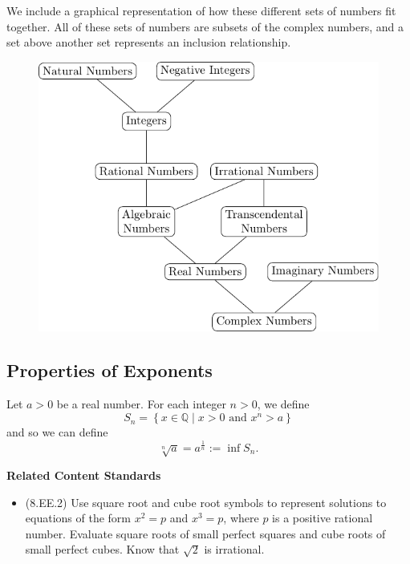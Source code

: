 \documentclass[
]{book}
\providecommand{\tightlist}{%
  \setlength{\itemsep}{0pt}\setlength{\parskip}{0pt}}
\newenvironment{standards}{}{}
\theoremstyle{definition}
\theoremstyle{definition}
\theoremstyle{definition}
\theoremstyle{definition}
\theoremstyle{remark}
\begin{document}
We include a graphical representation of how these different sets of numbers fit together. All of these sets of numbers are subsets of the complex numbers, and a set above another set represents an inclusion relationship.

\begin{figure}

{\centering \includegraphics[width=0.6\linewidth]{tikz/NumberTree} 

}

\end{figure}

\hypertarget{real-exponents}{%
\subsection{Properties of Exponents}\label{real-exponents}}

Let \(a>0\) be a real number. For each integer \(n>0\), we define \[S_n= \left\{ x\in \mathbb{Q}\middle \vert x>0 \mbox{ and } x^n>a\right\}\] and so we can define \[\sqrt[n]{a}=a^{\frac{1}{n}} := \inf S_n.\]

\begin{standards}

\begin{center}
\textbf{Related Content Standards}

\end{center}

\begin{itemize}
\tightlist
\item
  (8.EE.2) Use square root and cube root symbols to represent solutions to equations of the form \(x^2=p\) and \(x^3=p\), where \(p\) is a positive rational number. Evaluate square roots of small perfect squares and cube roots of small perfect cubes. Know that \(\sqrt{2}\) is irrational.\\
\end{itemize}

\end{standards}
\end{document}
